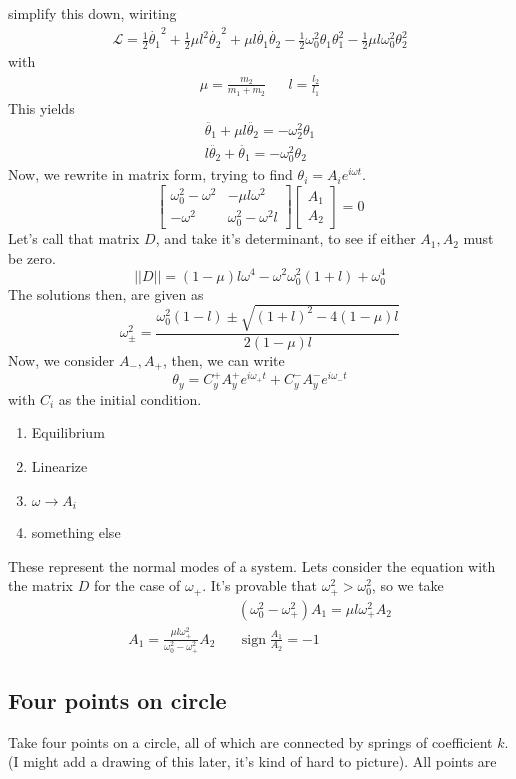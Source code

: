 \documentclass{article} \usepackage{amsmath} \usepackage{amssymb} \usepackage{amsthm} \usepackage[margin=0.2in]{geometry} \usepackage{hyperref} \usepackage{physics} \usepackage{tikz} \usepackage{mathtools} \mathtoolsset{showonlyrefs} \theoremstyle{definition} \newtheorem{theorem}{Theorem}[section] \newtheorem{corollary}{Corollary}[theorem] \newtheorem{lemma}[theorem]{Lemma} \newtheorem{definition}{Definition}[section] \author{Connor Duncan} \date{\today}
\begin{document}
simplify this down, wiriting \begin{align} \mathcal L=\frac{1}{2}\dot{\theta_1}^2+\frac{1}{2}\mu l^2\dot{\theta_2}^2+\mu l\dot{\theta_1}\dot{\theta_2} -\frac{1}{2}\omega_0^2\theta_1\theta_1^2-\frac{1}{2}\mu l\omega_0^2\theta_2^2 \end{align} with \begin{align} \mu=\frac{m_2}{m_1+m_2} && l=\frac{l_2}{l_1} \end{align} This yields \begin{align} \ddot{\theta_1}+\mu l\ddot{\theta_2}=-\omega_2^2\theta_1\\ l\ddot{\theta_2}+\ddot{\theta_1}=-\omega_0^2\theta_2 \end{align} Now, we rewrite in matrix form, trying to find $\theta_i=A_ie^{i\omega t}$. \begin{equation} \begin{bmatrix} \omega_0^2-\omega^2 & -\mu l\omega^2\\ -\omega^2 & \omega_0^2-\omega^2l \end{bmatrix} \begin{bmatrix}A_1\\A_2\end{bmatrix}=0 \end{equation} Let's call that matrix $D$, and take it's determinant, to see if either $A_1,A_2$ must be zero. \begin{equation} ||D||=(1-\mu)l\omega^4-\omega^2\omega_0^2(1+l)+\omega_0^4 \end{equation} The solutions then, are given as \begin{equation} \omega_\pm^2=\frac{\omega_0^2(1-l)\pm\sqrt{(1+l)^2-4(1-\mu)l}}{2(1-\mu)l} \end{equation} Now, we consider $A_-,A_+$, then, we can write \begin{equation} \theta_y=C_y^+A_y^+e^{i\omega_+t}+C_y^-A_y^-e^{i\omega_-t} \end{equation} with $C_i$ as the initial condition. \begin{enumerate} \item Equilibrium \item Linearize \item $\omega\rightarrow A_i$ \item something else \end{enumerate} These represent the normal modes of a system. Lets consider the equation with the matrix $D$ for the case of $\omega_+$. It's provable that $\omega_+^2>\omega_0^2$, so we take \begin{align} && (\omega_0^2-\omega_+^2)A_1=\mu l\omega_+^2A_2\\ A_1=\frac{\mu l\omega_+^2}{\omega_0^2-\omega_+^2}A_2 && \operatorname{sign}\frac{A_1}{A_2}=-1 \end{align} \subsection{Four points on circle} Take four points on a circle, all of which are connected by springs of coefficient $k$. (I might add a drawing of this later, it's kind of hard to picture). All points are 
\end{document}
